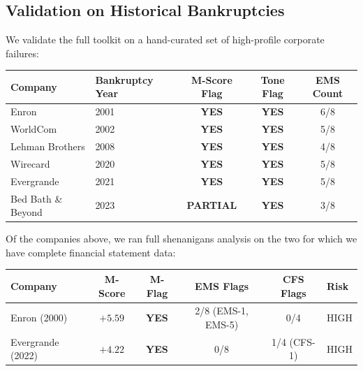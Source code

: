 \documentclass[12pt, a4paper]{article}
\begin{document}
\subsection{Validation on Historical Bankruptcies}

We validate the full toolkit on a hand-curated set of high-profile corporate failures:

\begin{center}
\begin{tabular}{l l c c c}
  \toprule
  \textbf{Company} & \textbf{Bankruptcy Year} & \textbf{M-Score Flag} & \textbf{Tone Flag} & \textbf{EMS Count} \\
  \midrule
  Enron          & 2001 & \textcolor{dangerred}{\bfseries YES} & \textcolor{dangerred}{\bfseries YES} & 6/8 \\
  WorldCom       & 2002 & \textcolor{dangerred}{\bfseries YES} & \textcolor{dangerred}{\bfseries YES} & 5/8 \\
  Lehman Brothers & 2008 & \textcolor{dangerred}{\bfseries YES} & \textcolor{dangerred}{\bfseries YES} & 4/8 \\
  Wirecard       & 2020 & \textcolor{dangerred}{\bfseries YES} & \textcolor{dangerred}{\bfseries YES} & 5/8 \\
  Evergrande     & 2021 & \textcolor{dangerred}{\bfseries YES} & \textcolor{dangerred}{\bfseries YES} & 5/8 \\
  Bed Bath \& Beyond & 2023 & \textcolor{warnorange}{\bfseries PARTIAL} & \textcolor{dangerred}{\bfseries YES} & 3/8 \\
  \bottomrule
\end{tabular}
\end{center}

\noindent Of the companies above, we ran full shenanigans analysis on the two for which we have complete financial statement data:

\begin{center}
\small
\begin{tabular}{l c c c c l}
  \toprule
  \textbf{Company} & \textbf{M-Score} & \textbf{M-Flag} & \textbf{EMS Flags} & \textbf{CFS Flags} & \textbf{Risk} \\
  \midrule
  Enron (2000)     & $+5.59$ & \textcolor{dangerred}{\bfseries YES} & 2/8 (EMS-1, EMS-5) & 0/4 & \textcolor{dangerred}{HIGH} \\
  Evergrande (2022) & $+4.22$ & \textcolor{dangerred}{\bfseries YES} & 0/8 & 1/4 (CFS-1) & \textcolor{dangerred}{HIGH} \\
  \bottomrule
\end{tabular}
\end{center}
\end{document}
